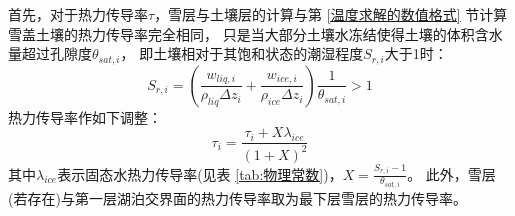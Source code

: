 首先，对于热力传导率$\tau$，雪层与土壤层的计算与第 \ref{温度求解的数值格式} 节计算雪盖土壤的热力传导率完全相同，
只是当大部分土壤水冻结使得土壤的体积含水量超过孔隙度$\theta_{sat,i}$，
即土壤相对于其饱和状态的潮湿程度$S_{r,i}$大于1时：
\begin{equation}
S_{r,i}=\left(\frac{w_{liq, i}}{\rho_{liq} \Delta z_{i}}+\frac{w_{ice, i}}{\rho_{ice} \Delta z_{i}}\right) 
\frac{1}{\theta_{sat,i}}>1
\end{equation}
热力传导率作如下调整：
\begin{equation}
\tau_{i}=\frac{\tau_{i}+X \lambda_{ice}}{(1+X)^{2}}
\end{equation}
其中$\lambda_{ice}$表示固态水热力传导率(见表 \ref{tab:物理常数})，$X=\frac{S_{r,i}-1}{\theta_{sat,i}}$。
此外，雪层(若存在)与第一层湖泊交界面的热力传导率取为最下层雪层的热力传导率。


